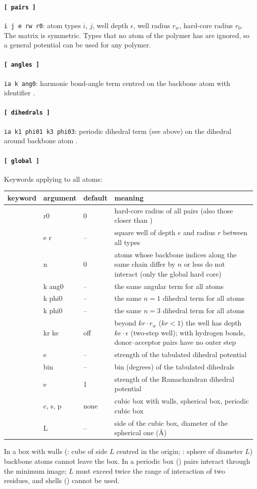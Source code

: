 \documentclass[11pt,a4paper]{article}
\newenvironment{keywords}
 {\begin{longtable}{>{\raggedright}p{0.2\textwidth}>{\raggedright}p{0.12\textwidth}>{\raggedright}p{0.14\textwidth}p{0.41\textwidth}}
  \toprule keyword & argument & default & meaning \\ \midrule \endhead
  \bottomrule \endfoot}
 {\end{longtable}}
\newcommand{\key}[4]{\kw{#1} & #2 & #3 & #4 \\}
\begin{document}
\paragraph{\texttt{[ pairs ]}} \texttt{i j e rw r0}: atom types $i$, $j$, well
depth $\epsilon$, well radius $r_w$, hard-core radius $r_0$. The matrix is
symmetric. Types that no atom of the polymer has are ignored, so a general
potential can be used for any polymer.

\paragraph{\texttt{[ angles ]}} \texttt{ia k ang0}: harmonic bond-angle term
centred on the backbone atom with identifier .

\paragraph{\texttt{[ dihedrals ]}} \texttt{ia k1 phi01 k3 phi03}: periodic dihedral
term (see above) on the dihedral around backbone atom .

\paragraph{\texttt{[ global ]}} Keywords applying to all atoms:
\begin{keywords}
\key{hardcore}{r0}{0}{hard-core radius of all pairs (also those closer than \kw{imin})}
\key{homopolymeric}{e r}{--}{square well of depth $e$ and radius $r$ between all types}
\key{imin}{n}{0}{atoms whose backbone indices along the same chain differ by $n$ or less do not interact (only the global hard core)}
\key{angle}{k ang0}{--}{the same angular term for all atoms}
\key{dihedral1}{k phi0}{--}{the same $n=1$ dihedral term for all atoms}
\key{dihedral3}{k phi0}{--}{the same $n=3$ dihedral term for all atoms}
\key{splice}{kr ke}{off}{beyond $kr\cdot r_w$ ($kr<1$) the well has depth $ke\cdot\epsilon$ (two-step well); with hydrogen bonds, donor--acceptor pairs have no outer step}
\key{e_dih}{e}{--}{strength of the tabulated dihedral potential}
\key{g_dihbin}{bin}{--}{bin (degrees) of the tabulated dihedrals}
\key{e_dihram}{e}{1}{strength of the Ramachandran dihedral potential}
\key{boxtype}{c, s, p}{none}{cubic box with walls, spherical box, periodic cubic box}
\key{boxsize}{L}{--}{side of the cubic box, diameter of the spherical one (\AA)}
\end{keywords}
In a box with walls (: cube of side $L$ centred in the origin;
: sphere of diameter $L$) backbone atoms cannot leave the box. In a
periodic box () pairs interact through the minimum image; $L$ must
exceed twice the range of interaction of two residues, and shells
() cannot be used.
\end{document}
